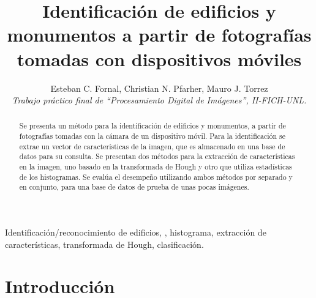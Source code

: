 \documentclass[conference,spanish,a4paper,10pt,oneside,final]{tfmpd}
\begin{document}
\title{Identificación de edificios y monumentos a partir de fotografías
tomadas con dispositivos móviles}
\author{Esteban C. Fornal, Christian N. Pfarher, Mauro J. Torrez\\
\textit{Trabajo práctico final de ``Procesamiento Digital de
Imágenes'', II-FICH-UNL.}}
\maketitle
%
%
%
%
\begin{abstract}
Se presenta un método para la identificación de edificios y monumentos, a
partir de fotografías tomadas con la cámara de un dispositivo móvil.
Para la identificación se extrae un vector de características de la imagen,
que es almacenado en una base de datos para su consulta.
Se presentan dos métodos para la extracción de características en la imagen, uno
basado en la transformada de Hough y otro que utiliza estadísticas de los
histogramas. Se evalúa el desempeño utilizando ambos métodos por separado y en
conjunto, para una base de datos de prueba de unas pocas imágenes.
\end{abstract}
%
%
%
%
\begin{keywords}
Identificación/reconocimiento de edificios, ,
histograma, extracción de características, transformada de Hough, clasificación.
\end{keywords}
%
%
%
%
\section{Introducción}
\end{document}

